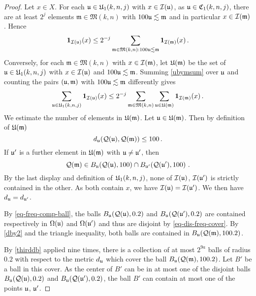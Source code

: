 {\begin{proof}
Let $x\in X$. For each
$\fu\in \fU_1(k,n,j)$ with $x\in \sc(\fu)$, as $\fu \in \fC_1(k,n,j)$,
there are at least $2^{j}$  elements $\mathfrak{m}\in \mathfrak{M}(k,n)$
with $100\fu \lesssim \mathfrak{m}$ and in particular
$x\in \sc(\mathfrak{m})$. Hence
\begin{equation}\label{ubymsum}
     \mathbf{1}_{\sc(\fu)}(x)
    \le 2^{-j}\sum_{\mathfrak{m} \in \mathfrak{M}(k,n): 100\fu\lesssim \mathfrak{m}} \mathbf{1}_{\sc(\mathfrak{m})}(x)\, .
\end{equation}
Conversely, for each $\mathfrak{m}\in \mathfrak{M}(k,n)$
with $x\in \sc(\mathfrak{m})$,
let $\fU(\mathfrak{m})$ be the set of
$\fu\in \fU_1(k,n,j)$ with $x\in \sc(\fu)$
and $100\fu \lesssim \mathfrak{m}$.
Summing \eqref{ubymsum} over $\fu$ and counting the pairs
$(\fu,\mathfrak{m})$ with $100\fu \lesssim \mathfrak{m}$
differently gives
\begin{equation}\label{usumbymsum}
     \sum_{\fu\in \fU_1(k,n,j)} \mathbf{1}_{\sc(\fu)}(x)
    \le 2^{-j}\sum_{\mathfrak{m} \in \mathfrak{M}(k,n)}
    \sum_{\fu \in \fU(\mathfrak{m})} \mathbf{1}_{\sc(\mathfrak{m})}(x)\, .
\end{equation}
We estimate the number of elements in $\fU(\mathfrak{m})$.
Let $\fu  \in \fU(\mathfrak{m})$.
Then by definition of
$\fU(\mathfrak{m})$
\begin{equation}\label{dby2}
     d_{\fu}(\fcc(\fu),\fcc(\mathfrak{m}))\le 100\, .
\end{equation}
If $\fu'$ is a further element in $\fU(\mathfrak{m})$ with $\fu\neq \fu'$, then
\begin{equation}
    \fcc(\mathfrak{m})
    \in B_{\fu}(\fcc(\fu),100)\cap B_{\fu'}(\fcc(\fu'),100)\ .
\end{equation}
By the last display and definition of $\fU_1(k,n,j)$, none of $\sc(\fu)$, $\sc(\fu')$ is strictly contained in the other. As both contain $x$, we have $\sc(\fu)=\sc(\fu')$.
We then have $d_{\fu}=d_{\fu'}$.

By \eqref{eq-freq-comp-ball}, the balls
$B_{\fu}(\fcc(\fu),0.2)$ and
$B_{\fu}(\fcc(\fu'),0.2)$ are
contained respectively in $\fc(\fu)$
and $\fc(\fu')$ and thus are disjoint by \eqref{eq-dis-freq-cover}.
By \eqref{dby2} and the triangle inequality, both balls are contained in $B_{\fu}(\fcc(\mathfrak{m}), 100.2)$.

By \eqref{thirddb} applied nine times, there is a collection of at most
$2^{9a}$ balls of radius $0.2$ with respect to the metric $d_{\fu}$ which cover the ball $B_{\fu}(\fcc(\mathfrak{m}),100.2)$.
Let $B'$ be a ball in this cover.
As the center of $B'$  can be in at most one of the disjoint balls
$B_{\fu}(\fcc(\fu),0.2)$ and
$B_{\fu}(\fcc(\fu'),0.2)$,
the ball $B'$ can contain at most
one of the points $\fu$, $\fu'$.


\end{proof}}
